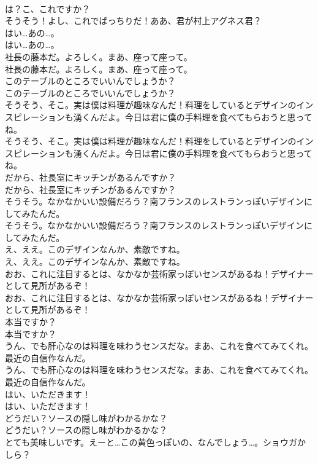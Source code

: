 \documentclass[8pt]{extreport}
\begin{document}
\begin{CJK}{UTF8}{min}
\\	は？こ、これですか？ 
\\	そうそう！よし、これでばっちりだ！ああ、君が村上アグネス君？ 
\\	はい…あの…。	
\\	はい…あの…。 
\\	社長の藤本だ。よろしく。まあ、座って座って。	
\\	社長の藤本だ。よろしく。まあ、座って座って。 
\\	このテーブルのところでいいんでしょうか？	
\\	このテーブルのところでいいんでしょうか？ 
\\	そうそう、そこ。実は僕は料理が趣味なんだ！料理をしているとデザインのインスピレーションも湧くんだよ。今日は君に僕の手料理を食べてもらおうと思ってね。	
\\	そうそう、そこ。実は僕は料理が趣味なんだ！料理をしているとデザインのインスピレーションも湧くんだよ。今日は君に僕の手料理を食べてもらおうと思ってね。 
\\	だから、社長室にキッチンがあるんですか？	
\\	だから、社長室にキッチンがあるんですか？ 
\\	そうそう。なかなかいい設備だろう？南フランスのレストランっぽいデザインにしてみたんだ。	
\\	そうそう。なかなかいい設備だろう？南フランスのレストランっぽいデザインにしてみたんだ。 
\\	え、ええ。このデザインなんか、素敵ですね。	
\\	え、ええ。このデザインなんか、素敵ですね。 
\\	おお、これに注目するとは、なかなか芸術家っぽいセンスがあるね！デザイナーとして見所があるぞ！	
\\	おお、これに注目するとは、なかなか芸術家っぽいセンスがあるね！デザイナーとして見所があるぞ！ 
\\	本当ですか？	
\\	本当ですか？ 
\\	うん、でも肝心なのは料理を味わうセンスだな。まあ、これを食べてみてくれ。最近の自信作なんだ。	
\\	うん、でも肝心なのは料理を味わうセンスだな。まあ、これを食べてみてくれ。最近の自信作なんだ。 
\\	はい、いただきます！	
\\	はい、いただきます！ 
\\	どうだい？ソースの隠し味がわかるかな？	
\\	どうだい？ソースの隠し味がわかるかな？ 
\\	とても美味しいです。えーと…この黄色っぽいの、なんでしょう…。ショウガかしら？	

\end{CJK}
\end{document}
